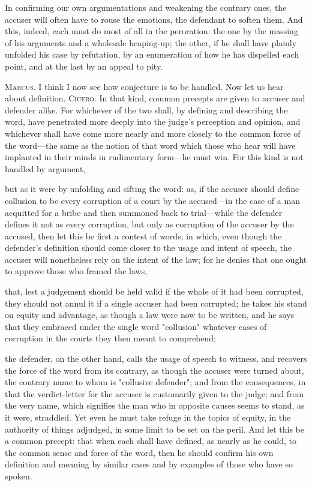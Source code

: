  In confirming our own argumentations and weakening the contrary ones, the accuser will often have to rouse the emotions, the defendant to soften them. And this, indeed, each must do most of all in the peroration: the one by the massing of his arguments and a wholesale heaping-up; the other, if he shall have plainly unfolded his case by refutation, by an enumeration of how he has dispelled each point, and at the last by an appeal to pity.

 \textsc{Marcus.} I think I now see how conjecture is to be handled. Now let us hear about definition. \textsc{Cicero.} In that kind, common precepts are given to accuser and defender alike. For whichever of the two shall, by defining and describing the word, have penetrated more deeply into the judge's perception and opinion, and whichever shall have come more nearly and more closely to the common force of the word—the same as the notion of that word which those who hear will have implanted in their minds in rudimentary form—he must win. For this kind is not handled by argument,

 but as it were by unfolding and sifting the word: as, if the accuser should define collusion to be every corruption of a court by the accused—in the case of a man acquitted for a bribe and then summoned back to trial—while the defender defines it not as every corruption, but only as corruption of the accuser by the accused, then let this be first a contest of words; in which, even though the defender's definition should come closer to the usage and intent of speech, the accuser will nonetheless rely on the intent of the law; for he denies that one ought to approve those who framed the laws,

 that, lest a judgement should be held valid if the whole of it had been corrupted, they should not annul it if a single accuser had been corrupted; he takes his stand on equity and advantage, as though a law were now to be written, and he says that they embraced under the single word "collusion" whatever cases of corruption in the courts they then meant to comprehend;

 the defender, on the other hand, calls the usage of speech to witness, and recovers the force of the word from its contrary, as though the accuser were turned about, the contrary name to whom is "collusive defender"; and from the consequences, in that the verdict-letter for the accuser is customarily given to the judge; and from the very name, which signifies the man who in opposite causes seems to stand, as it were, straddled. Yet even he must take refuge in the topics of equity, in the authority of things adjudged, in some limit to be set on the peril. And let this be a common precept: that when each shall have defined, as nearly as he could, to the common sense and force of the word, then he should confirm his own definition and meaning by similar cases and by examples of those who have so spoken.

